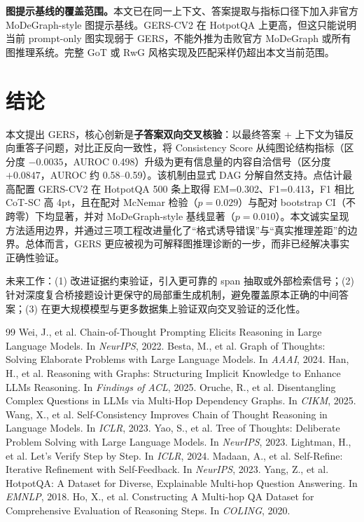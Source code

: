 \documentclass[11pt,a4paper]{ctexart}
\begin{document}
\textbf{图提示基线的覆盖范围。}本文已在同一上下文、答案提取与指标口径下加入非官方 MoDeGraph-style 图提示基线。GERS-CV2 在 HotpotQA 上更高，但这只能说明当前 prompt-only 图实现弱于 GERS，不能外推为击败官方 MoDeGraph 或所有图推理系统。完整 GoT 或 RwG 风格实现及匹配采样仍超出本文当前范围。

\section{结论}

本文提出 GERS，核心创新是\textbf{子答案双向交叉核验}：以最终答案 + 上下文为锚反向重答子问题，对比正反向一致性，将 Consistency Score 从纯图论结构指标（区分度 $-0.0035$，AUROC 0.498）升级为更有信息量的内容自洽信号（区分度 $+0.0847$，AUROC 约 0.58--0.59）。该机制由显式 DAG 分解自然支持。点估计最高配置 GERS-CV2 在 HotpotQA 500 条上取得 EM=0.302、F1=0.413，F1 相比 CoT-SC 高 4pt，且在配对 McNemar 检验（$p=0.029$）与配对 bootstrap CI（不跨零）下均显著，并对 MoDeGraph-style 基线显著（$p=0.010$）。本文诚实呈现方法适用边界，并通过三项工程改进量化了``格式诱导错误''与``真实推理差距''的边界。总体而言，GERS 更应被视为可解释图推理诊断的一步，而非已经解决事实正确性验证。

未来工作：(1) 改进证据约束验证，引入更可靠的 span 抽取或外部检索信号；(2) 针对深度复合桥接题设计更保守的局部重生成机制，避免覆盖原本正确的中间答案；(3) 在更大规模模型与更多数据集上验证双向交叉验证的泛化性。

\begin{thebibliography}{99}
 Wei, J., et al. Chain-of-Thought Prompting Elicits Reasoning in Large Language Models. In \emph{NeurIPS}, 2022.
 Besta, M., et al. Graph of Thoughts: Solving Elaborate Problems with Large Language Models. In \emph{AAAI}, 2024.
 Han, H., et al. Reasoning with Graphs: Structuring Implicit Knowledge to Enhance LLMs Reasoning. In \emph{Findings of ACL}, 2025.
 Oruche, R., et al. Disentangling Complex Questions in LLMs via Multi-Hop Dependency Graphs. In \emph{CIKM}, 2025.
 Wang, X., et al. Self-Consistency Improves Chain of Thought Reasoning in Language Models. In \emph{ICLR}, 2023.
 Yao, S., et al. Tree of Thoughts: Deliberate Problem Solving with Large Language Models. In \emph{NeurIPS}, 2023.
 Lightman, H., et al. Let's Verify Step by Step. In \emph{ICLR}, 2024.
 Madaan, A., et al. Self-Refine: Iterative Refinement with Self-Feedback. In \emph{NeurIPS}, 2023.
 Yang, Z., et al. HotpotQA: A Dataset for Diverse, Explainable Multi-hop Question Answering. In \emph{EMNLP}, 2018.
 Ho, X., et al. Constructing A Multi-hop QA Dataset for Comprehensive Evaluation of Reasoning Steps. In \emph{COLING}, 2020.
\end{thebibliography}
\end{document}
